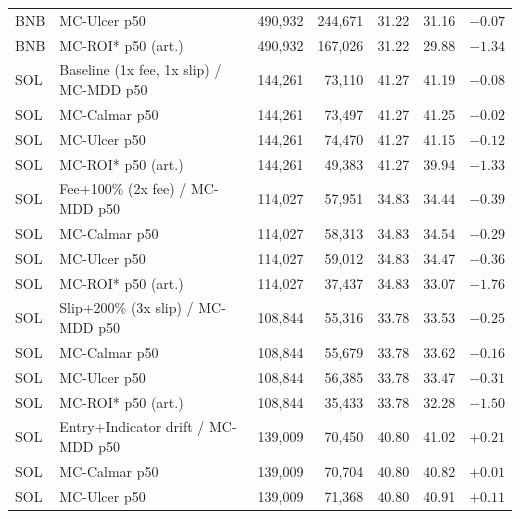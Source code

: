\begin{table}[ht]
\begin{tabular}{llrrrrr}
BNB & \hspace{1em}MC-Ulcer p50 & 490,932 & 244,671 & 31.22 & 31.16 & $-0.07$ \\
BNB & \hspace{1em}MC-ROI* p50 (art.) & 490,932 & 167,026 & 31.22 & 29.88 & $-1.34$ \\
\midrule
SOL & Baseline (1x fee, 1x slip) / MC-MDD p50 & 144,261 & 73,110 & 41.27 & 41.19 & $-0.08$ \\
SOL & \hspace{1em}MC-Calmar p50 & 144,261 & 73,497 & 41.27 & 41.25 & $-0.02$ \\
SOL & \hspace{1em}MC-Ulcer p50 & 144,261 & 74,470 & 41.27 & 41.15 & $-0.12$ \\
SOL & \hspace{1em}MC-ROI* p50 (art.) & 144,261 & 49,383 & 41.27 & 39.94 & $-1.33$ \\
SOL & Fee+100\% (2x fee) / MC-MDD p50 & 114,027 & 57,951 & 34.83 & 34.44 & $-0.39$ \\
SOL & \hspace{1em}MC-Calmar p50 & 114,027 & 58,313 & 34.83 & 34.54 & $-0.29$ \\
SOL & \hspace{1em}MC-Ulcer p50 & 114,027 & 59,012 & 34.83 & 34.47 & $-0.36$ \\
SOL & \hspace{1em}MC-ROI* p50 (art.) & 114,027 & 37,437 & 34.83 & 33.07 & $-1.76$ \\
SOL & Slip+200\% (3x slip) / MC-MDD p50 & 108,844 & 55,316 & 33.78 & 33.53 & $-0.25$ \\
SOL & \hspace{1em}MC-Calmar p50 & 108,844 & 55,679 & 33.78 & 33.62 & $-0.16$ \\
SOL & \hspace{1em}MC-Ulcer p50 & 108,844 & 56,385 & 33.78 & 33.47 & $-0.31$ \\
SOL & \hspace{1em}MC-ROI* p50 (art.) & 108,844 & 35,433 & 33.78 & 32.28 & $-1.50$ \\
SOL & Entry+Indicator drift / MC-MDD p50 & 139,009 & 70,450 & 40.80 & 41.02 & $+0.21$ \\
SOL & \hspace{1em}MC-Calmar p50 & 139,009 & 70,704 & 40.80 & 40.82 & $+0.01$ \\
SOL & \hspace{1em}MC-Ulcer p50 & 139,009 & 71,368 & 40.80 & 40.91 & $+0.11$ \\

\end{tabular}
\end{table}
